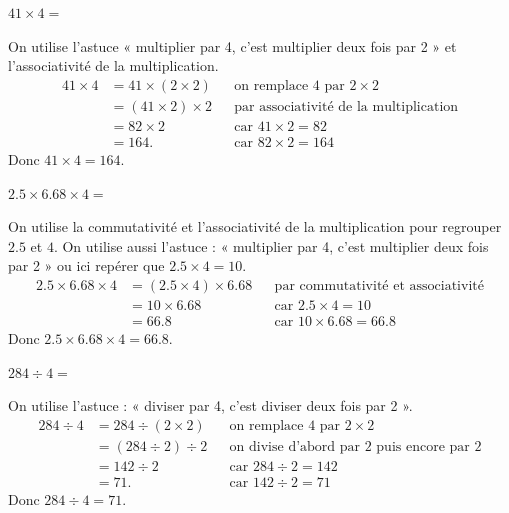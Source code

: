 \documentclass[answers]{exam}
\begin{document}
\begin{questions}

  \question $41 \times 4 =$
  \begin{solution}
  On utilise l’astuce « multiplier par 4, c’est multiplier deux fois par 2 » et l’associativité de la multiplication.
  \begin{align*}
    41 \times 4 
      &= 41 \times (2 \times 2) &&\text{on remplace $4$ par $2 \times 2$} \\
      &= (41 \times 2) \times 2 &&\text{par associativité de la multiplication} \\
      &= 82 \times 2 &&\text{car } 41 \times 2 = 82 \\
      &= 164. &&\text{car } 82 \times 2 = 164
  \end{align*}
  Donc $41 \times 4 = 164$.
  \end{solution}

  \question $2.5 \times 6.68 \times 4 =$
  \begin{solution}
  On utilise la commutativité et l’associativité de la multiplication pour regrouper $2.5$ et $4$. On utilise aussi l’astuce : « multiplier par 4, c’est multiplier deux fois par 2 » ou ici repérer que $2.5 \times 4 = 10$.
  \begin{align*}
    2.5 \times 6.68 \times 4
      &= (2.5 \times 4) \times 6.68 &&\text{par commutativité et associativité} \\
      &= 10 \times 6.68 &&\text{car } 2.5 \times 4 = 10 \\
      &= 66.8 &&\text{car } 10 \times 6.68 = 66.8
  \end{align*}
  Donc $2.5 \times 6.68 \times 4 = 66.8$.
  \end{solution}

  \question $284 \div 4 =$
  \begin{solution}
  On utilise l’astuce : « diviser par 4, c’est diviser deux fois par 2 ».
  \begin{align*}
    284 \div 4
      &= 284 \div (2 \times 2) &&\text{on remplace $4$ par $2 \times 2$} \\
      &=(284 \div 2) \div 2 &&\text{on divise d'abord par 2 puis encore par 2} \\
      &= 142 \div 2 &&\text{car } 284 \div 2 = 142 \\
      &= 71. &&\text{car } 142 \div 2 = 71
  \end{align*}
  Donc $284 \div 4 = 71$.
  \end{solution}


\end{questions}
\end{document}
